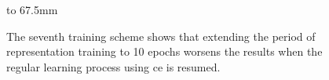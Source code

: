 \begin{figure}[p]
    \hbox to 67.5mm{}
    \caption[The results of the seventh training scheme]{The seventh training scheme shows that extending the period of representation training to 10 epochs worsens the results when the regular learning process using \gls{ce} is resumed.}
    \label{fig:training_scheme_7}
\end{figure}

